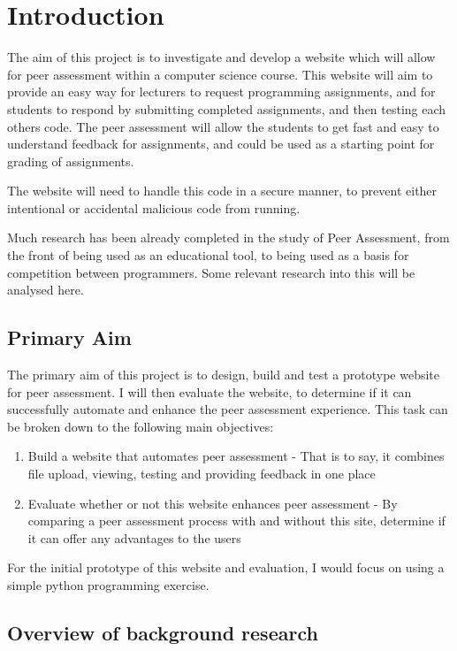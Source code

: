 \documentclass[a4paper,11pt]{report}
\begin{document}
\pagebreak

\pagestyle{headings}




\section{Introduction}
The aim of this project is to investigate and develop a website which will allow for peer assessment within a computer science course. This website will aim to provide an easy way for lecturers to request programming assignments, and for students to respond by submitting completed assignments, and then testing each others code. The peer assessment will allow the students to get fast and easy to understand feedback for assignments, and could be used as a starting point for grading of assignments.\par
The website will need to handle this code in a secure manner, to prevent either intentional or accidental malicious code from running.\par
Much research has been already completed in the study of Peer Assessment, from the front of being used as an educational tool, to being used as a basis for competition between programmers. Some relevant research into this will be analysed here.

\subsection{Primary Aim}
The primary aim of this project is to design, build and test a prototype website for peer assessment. I will then evaluate the website, to determine if it can successfully automate and enhance the peer assessment experience. This task can be broken down to the following main objectives:
\begin{enumerate}
\item Build a website that automates peer assessment - That is to say, it combines file upload, viewing, testing and providing feedback in one place
\item Evaluate whether or not this website enhances peer assessment - By comparing a peer assessment process with and without this site, determine if it can offer any advantages to the users
\end{enumerate}
For the initial prototype of this website and evaluation, I would focus on using a simple python programming exercise.
\subsection{Overview of background research}
\end{document}
